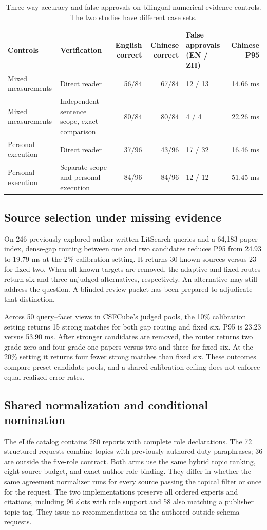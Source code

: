 \begin{table}[t]
\caption{Three-way accuracy and false approvals on bilingual numerical evidence controls. The two studies have different case sets.}
\label{tab:controls}
\centering\small
\begin{tabular}{@{}llrrlr@{}}\toprule
Controls & Verification & English correct & Chinese correct & False approvals (EN / ZH) & Chinese P95 \\\midrule
Mixed measurements & Direct reader & 56/84 & 67/84 & 12 / 13 & 14.66 ms \\
Mixed measurements & Independent sentence scope, exact comparison & 80/84 & 80/84 & 4 / 4 & 22.26 ms \\
Personal execution & Direct reader & 37/96 & 43/96 & 17 / 32 & 16.46 ms \\
Personal execution & Separate scope and personal execution & 84/96 & 84/96 & 12 / 12 & 51.45 ms \\\bottomrule
\end{tabular}
\end{table}

\subsection{Source selection under missing evidence}
On 246 previously explored author-written LitSearch queries and a 64,183-paper index, dense-gap routing between one and two candidates reduces P95 from 24.93 to 19.79 ms at the 2\% calibration setting. It returns 30 known sources versus 23 for fixed two. When all known targets are removed, the adaptive and fixed routes return six and three unjudged alternatives, respectively. An alternative may still address the question. A blinded review packet has been prepared to adjudicate that distinction.

Across 50 query--facet views in CSFCube's judged pools, the 10\% calibration setting returns 15 strong matches for both gap routing and fixed six. P95 is 23.23 versus 53.90 ms. After stronger candidates are removed, the router returns two grade-zero and four grade-one papers versus two and three for fixed six. At the 20\% setting it returns four fewer strong matches than fixed six. These outcomes compare preset candidate pools, and a shared calibration ceiling does not enforce equal realized error rates.

\subsection{Shared normalization and conditional nomination}
The eLife catalog contains 280 reports with complete role declarations. The 72 structured requests combine topics with previously authored duty paraphrases; 36 are outside the five-role contract. Both arms use the same hybrid topic ranking, eight-source budget, and exact author-role binding. They differ in whether the same agreement normalizer runs for every source passing the topical filter or once for the request. The two implementations preserve all ordered experts and citations, including 96 slots with role support and 58 also matching a publisher topic tag. They issue no recommendations on the authored outside-schema requests.

